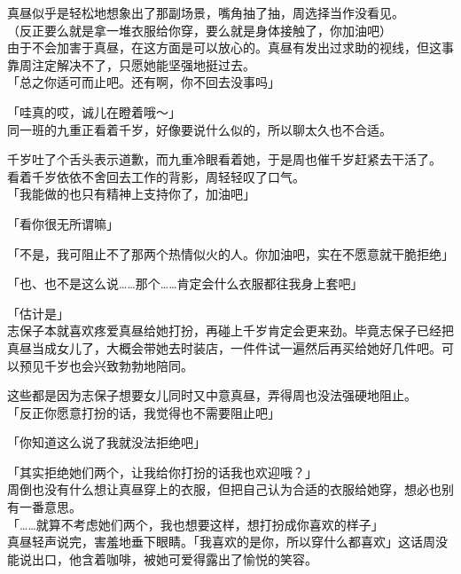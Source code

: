 真昼似乎是轻松地想象出了那副场景，嘴角抽了抽，周选择当作没看见。\\

（反正要么就是拿一堆衣服给你穿，要么就是身体接触了，你加油吧）\\

由于不会加害于真昼，在这方面是可以放心的。真昼有发出过求助的视线，但这事靠周注定解决不了，只愿她能坚强地挺过去。\\

「总之你适可而止吧。还有啊，你不回去没事吗」

「哇真的哎，诚儿在瞪着哦～」\\

同一班的九重正看着千岁，好像要说什么似的，所以聊太久也不合适。

千岁吐了个舌头表示道歉，而九重冷眼看着她，于是周也催千岁赶紧去干活了。\\

看着千岁依依不舍回去工作的背影，周轻轻叹了口气。\\

「我能做的也只有精神上支持你了，加油吧」

「看你很无所谓嘛」

「不是，我可阻止不了那两个热情似火的人。你加油吧，实在不愿意就干脆拒绝」

「也、也不是这么说……那个……肯定会什么衣服都往我身上套吧」

「估计是」\\

志保子本就喜欢疼爱真昼给她打扮，再碰上千岁肯定会更来劲。毕竟志保子已经把真昼当成女儿了，大概会带她去时装店，一件件试一遍然后再买给她好几件吧。可以预见千岁也会兴致勃勃地陪同。

这些都是因为志保子想要女儿同时又中意真昼，弄得周也没法强硬地阻止。\\

「反正你愿意打扮的话，我觉得也不需要阻止吧」

「你知道这么说了我就没法拒绝吧」

「其实拒绝她们两个，让我给你打扮的话我也欢迎哦？」\\

周倒也没有什么想让真昼穿上的衣服，但把自己认为合适的衣服给她穿，想必也别有一番意思。\\

「……就算不考虑她们两个，我也想要这样，想打扮成你喜欢的样子」\\

真昼轻声说完，害羞地垂下眼睛。「我喜欢的是你，所以穿什么都喜欢」这话周没能说出口，他含着咖啡，被她可爱得露出了愉悦的笑容。
